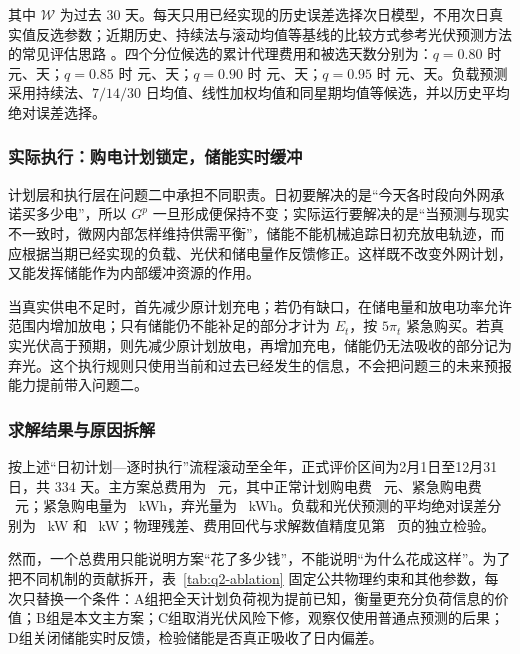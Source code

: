 其中 $\mathcal W$ 为过去 $30$ 天。每天只用已经实现的历史误差选择次日模型，不用次日真实值反选参数；近期历史、持续法与滚动均值等基线的比较方式参考光伏预测方法的常见评估思路 \cite{markovics2022comparison}。四个分位候选的累计代理费用和被选天数分别为：$q=0.80$ 时 \PvQuantEightyScore 元、\PvQuantEightyDays 天；$q=0.85$ 时 \PvQuantEightyFiveScore 元、\PvQuantEightyFiveDays 天；$q=0.90$ 时 \PvQuantNinetyScore 元、\PvQuantNinetyDays 天；$q=0.95$ 时 \PvQuantNinetyFiveScore 元、\PvQuantNinetyFiveDays 天。负载预测采用持续法、$7/14/30$ 日均值、线性加权均值和同星期均值等候选，并以历史平均绝对误差选择。

\subsubsection{实际执行：购电计划锁定，储能实时缓冲}

计划层和执行层在问题二中承担不同职责。日初要解决的是“今天各时段向外网承诺买多少电”，所以 $G^p$ 一旦形成便保持不变；实际运行要解决的是“当预测与现实不一致时，微网内部怎样维持供需平衡”，储能不能机械追踪日初充放电轨迹，而应根据当期已经实现的负载、光伏和储电量作反馈修正。这样既不改变外网计划，又能发挥储能作为内部缓冲资源的作用。

当真实供电不足时，首先减少原计划充电；若仍有缺口，在储电量和放电功率允许范围内增加放电；只有储能仍不能补足的部分才计为 $E_t$，按 $5\pi_t$ 紧急购买。若真实光伏高于预期，则先减少原计划放电，再增加充电，储能仍无法吸收的部分记为弃光。这个执行规则只使用当前和过去已经发生的信息，不会把问题三的未来预报能力提前带入问题二。

\subsubsection{求解结果与原因拆解}

按上述“日初计划—逐时执行”流程滚动至全年，正式评价区间为2月1日至12月31日，共 $334$ 天。主方案总费用为 \QtwoTotal\ 元，其中正常计划购电费 \QtwoPlan\ 元、紧急购电费 \QtwoEmergencyCost\ 元；紧急购电量为 \QtwoEmergency\ kWh，弃光量为 \QtwoCurtail\ kWh。负载和光伏预测的平均绝对误差分别为 \QtwoMae\ kW 和 \QtwoPvMae\ kW；物理残差、费用回代与求解数值精度见第~\pageref{sec:validation} 页的独立检验。

然而，一个总费用只能说明方案“花了多少钱”，不能说明“为什么花成这样”。为了把不同机制的贡献拆开，表~\ref{tab:q2-ablation} 固定公共物理约束和其他参数，每次只替换一个条件：A组把全天计划负荷视为提前已知，衡量更充分负荷信息的价值；B组是本文主方案；C组取消光伏风险下修，观察仅使用普通点预测的后果；D组关闭储能实时反馈，检验储能是否真正吸收了日内偏差。

